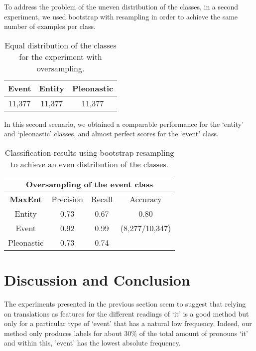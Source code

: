 \documentclass[10pt, a4paper]{article} \usepackage{lrec} \usepackage{multibib}
\begin{document}
To address the problem of the uneven distribution of the classes, in a second experiment, we used bootstrap with resampling in order to achieve the same number of examples per class. 

\begin{table}[h!]\centering
\begin{tabular}{ccc}
\toprule
\textbf{Event} & \textbf{Entity} & \textbf{Pleonastic} \\
\midrule
11,377 & 11,377 & 11,377 \\
\bottomrule
\end{tabular}
\caption{Equal distribution of the classes for the experiment with oversampling.}
\end{table}

In this second scenario, we obtained a comparable performance for the `entity' and `pleonastic' classes, and almost perfect scores for the `event' class. 

\begin{center} \begin{table}[h!] \begin{tabular}{cccc}
\multicolumn{4}{c}{\textbf{Oversampling of the event class}}\\ 
\toprule
\textbf{MaxEnt}& Precision & Recall & Accuracy \\ 
\midrule 
 Entity & 0.73 &0.67& 0.80 \\ 
 Event & 0.92 & 0.99 & (8,277/10,347) \\ 
  Pleonastic &  0.73 & 0.74 & \\
\bottomrule 
\end{tabular} 
\caption{Classification results using bootstrap
resampling to achieve an even distribution of the classes.}\label{tab:maxentoversampling}
\end{table}
\end{center}


\section{Discussion and Conclusion}

The experiments presented in the previous section seem to suggest that relying on translations as features for the different readings of `it' is a good method but only for a particular type of `event' that has a natural low frequency. Indeed, our method only produces labels for about 30\% of the total amount of pronouns `it' and within this, 'event' has the lowest absolute frequency. 
\end{document}
